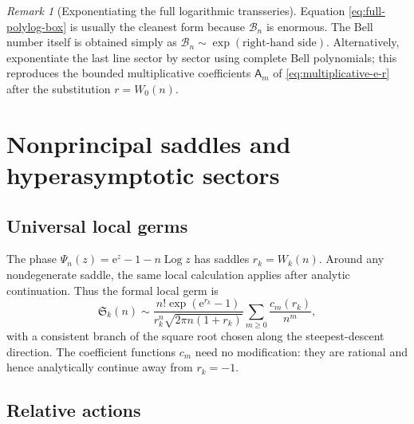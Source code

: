 \documentclass[11pt,a4paper]{article}
\theoremstyle{definition}
\theoremstyle{remark}
\newtheorem{remark}[theorem]{Remark}
\newcommand{\Bell}{\mathcal B}
\newcommand{\ee}{\mathrm e}
\newcommand{\cA}{\mathsf A}
\DeclareMathOperator{\Log}{Log}
\begin{document}
\begin{remark}[Exponentiating the full logarithmic transseries]
Equation \cref{eq:full-polylog-box} is usually the cleanest form because
\(\Bell_n\) is enormous.  The Bell number itself is obtained simply as
\(\Bell_n\sim\exp(\text{right-hand side})\).  Alternatively, exponentiate the
last line sector by sector using complete Bell polynomials; this reproduces the
bounded multiplicative coefficients \(\cA_m\) of
\cref{eq:multiplicative-e-r} after the substitution \(r=W_0(n)\).
\end{remark}

\section{Nonprincipal saddles and hyperasymptotic sectors}\label{sec:complex}

\subsection{Universal local germs}

The phase \(\Psi_n(z)=\ee^z-1-n\Log z\) has saddles
\(r_k=W_k(n)\).  Around any nondegenerate saddle, the same local calculation
applies after analytic continuation.  Thus the formal local germ is
\begin{equation}\label{eq:complex-local-germ}
 \mathfrak S_k(n)\sim
 \frac{n!\exp(\ee^{r_k}-1)}{r_k^n\sqrt{2\pi n(1+r_k)}}
 \sum_{m\ge0}\frac{c_m(r_k)}{n^m},
\end{equation}
with a consistent branch of the square root chosen along the steepest-descent
direction.  The coefficient functions \(c_m\) need no modification: they are
rational and hence analytically continue away from \(r_k=-1\).

\subsection{Relative actions}
\end{document}
